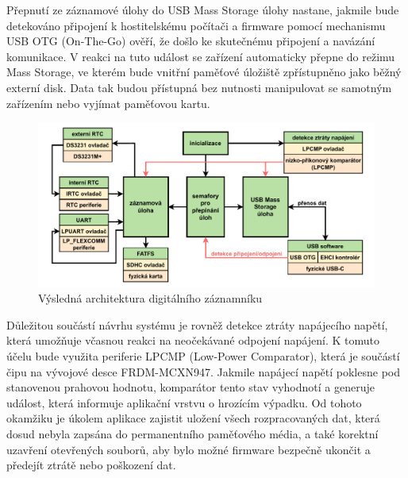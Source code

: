 Přepnutí ze záznamové úlohy do USB Mass Storage úlohy nastane, jakmile bude detekováno připojení k hostitelskému počítači a firmware pomocí mechanismu USB OTG (On-The-Go) ověří, že došlo ke skutečnému připojení a navázání komunikace. V reakci na tuto událost se zařízení automaticky přepne do režimu Mass Storage, ve kterém bude vnitřní paměťové úložiště zpřístupněno jako běžný externí disk. Data tak budou přístupná bez nutnosti manipulovat se samotným zařízením nebo vyjímat paměťovou kartu.

\begin{figure}[h]
    \centering
    \includegraphics[width=1.00\textwidth]{obrazky-figures/system_architecture.pdf}
    
    \caption{Výsledná architektura digitálního záznamníku}
    \label{fig:system-architecture}
\end{figure}

Důležitou součástí návrhu systému je rovněž detekce ztráty napájecího napětí, která umožňuje včasnou reakci na neočekávané odpojení napájení. K tomuto účelu bude využita periferie LPCMP (Low-Power Comparator), která je součástí čipu na vývojové desce FRDM-MCXN947. Jakmile napájecí napětí poklesne pod stanovenou prahovou hodnotu, komparátor tento stav vyhodnotí a generuje událost, která informuje aplikační vrstvu o hrozícím výpadku. Od tohoto okamžiku je úkolem aplikace zajistit uložení všech rozpracovaných dat, která dosud nebyla zapsána do permanentního paměťového média, a také korektní uzavření otevřených souborů, aby bylo možné firmware bezpečně ukončit a předejít ztrátě nebo poškození dat.




